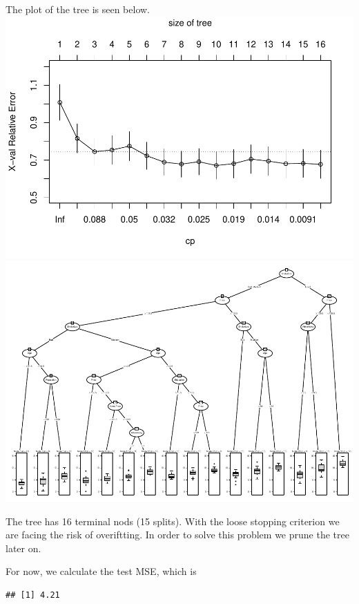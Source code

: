 \documentclass[
]{article}
\begin{document}
The plot of the tree is seen below.
\includegraphics{A3_files/figure-latex/unnamed-chunk-5-1.pdf}
\includegraphics{A3_files/figure-latex/unnamed-chunk-5-2.pdf}

The tree has 16 terminal nods (15 splits). With the loose stopping
criterion we are facing the risk of overiftting. In order to solve this
problem we prune the tree later on.

For now, we calculate the test MSE, which is

\begin{verbatim}
## [1] 4.21
\end{verbatim}
\end{document}
